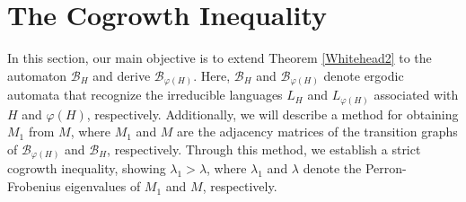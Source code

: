\documentclass{article}
\newcommand{\B}{\mathcal{B}}
\begin{document}
\section{The Cogrowth Inequality}
In this section, our main objective is to extend Theorem \ref{Whitehead2} to the automaton $\B_H$ and derive $\B_{\varphi(H)}$. Here, $\B_H$ and $\B_{\varphi(H)}$ denote ergodic automata that recognize the irreducible languages $L_H$ and $L_{\varphi(H)}$ associated with $H$ and $\varphi(H)$, respectively. Additionally, we will describe a method for obtaining $M_1$ from $M$, where $M_1$ and $M$ are the adjacency matrices of the transition graphs of $\B_{\varphi(H)}$ and $\B_H$, respectively. Through this method, we establish a strict cogrowth inequality, showing $\lambda_1 > \lambda$, where $\lambda_1$ and $\lambda$ denote the Perron-Frobenius eigenvalues of $M_1$ and $M$, respectively. 
\end{document}
